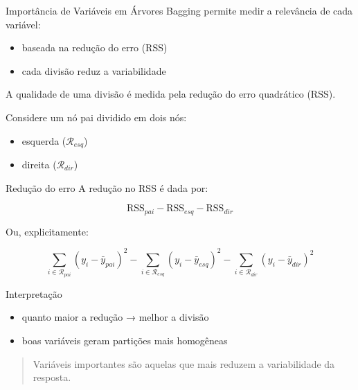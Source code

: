 \documentclass[
  ignorenonframetext,
  aspectratio=169,
]{beamer}
\providecommand{\tightlist}{%
  \setlength{\itemsep}{0pt}\setlength{\parskip}{0pt}}
\begin{document}
\begin{frame}
\begin{block}{Importância de Variáveis em Árvores}
\label{importuxe2ncia-de-variuxe1veis-em-uxe1rvores}
Bagging permite medir a relevância de cada variável:

\begin{itemize}
\tightlist
\item
  baseada na redução do erro (RSS)\\
\item
  cada divisão reduz a variabilidade
\end{itemize}

A qualidade de uma divisão é medida pela redução do erro quadrático
(RSS).

Considere um nó pai dividido em dois nós:

\begin{itemize}
\tightlist
\item
  esquerda (\(\mathcal{R}_{esq}\))\\
\item
  direita (\(\mathcal{R}_{dir}\))
\end{itemize}
\end{block}
\end{frame}

\begin{frame}
\begin{block}{Redução do erro}
\label{reduuxe7uxe3o-do-erro}
A redução no RSS é dada por:

\[
\text{RSS}_{pai}
-
\text{RSS}_{esq}
-
\text{RSS}_{dir}
\]

Ou, explicitamente:

\[
\sum_{i \in \mathcal{R}_{pai}} (y_i - \bar{y}_{pai})^2
-
\sum_{i \in \mathcal{R}_{esq}} (y_i - \bar{y}_{esq})^2
-
\sum_{i \in \mathcal{R}_{dir}} (y_i - \bar{y}_{dir})^2
\]
\end{block}
\end{frame}

\begin{frame}
\begin{block}{Interpretação}
\label{interpretauxe7uxe3o-5}
\begin{itemize}
\tightlist
\item
  quanto maior a redução → melhor a divisão\\
\item
  boas variáveis geram partições mais homogêneas
\end{itemize}

\begin{quote}
Variáveis importantes são aquelas que mais reduzem a variabilidade da
resposta.
\end{quote}
\end{block}
\end{frame}
\end{document}
